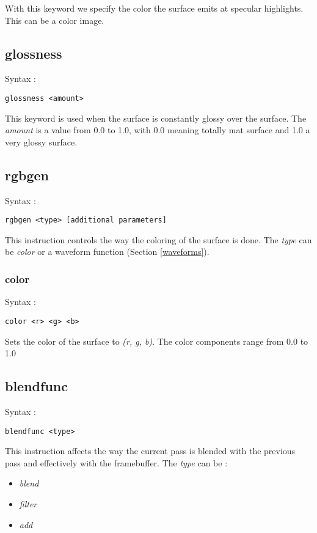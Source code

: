 \documentclass[12pt, titlepage]{amsart}
\begin{document}
With this keyword we specify the color the surface emits at specular
highlights. This can be a color image.

\subsection{glossness}
Syntax :
\begin{verbatim}
glossness <amount>
\end{verbatim}

This keyword is used when the surface is constantly glossy over the
surface. The \textit{amount} is a value from 0.0 to 1.0, with 0.0
meaning totally mat surface and 1.0 a very glossy surface.

\subsection{rgbgen}
Syntax :
\begin{verbatim}
rgbgen <type> [additional parameters]
\end{verbatim}

This instruction controls the way the coloring of the surface is done.
The \textit{type} can be \textit{color} or a waveform function (Section \ref{waveforms}).

\subsubsection{color}
Syntax :
\begin{verbatim}
color <r> <g> <b>
\end{verbatim}

Sets the color of the surface to \textit{(r, g, b)}. The color components
range from 0.0 to 1.0

\subsection{blendfunc}
Syntax :
\begin{verbatim}
blendfunc <type>
\end{verbatim}

This instruction affects the way the current pass is blended with the
previous pass and effectively with the framebuffer. The \textit{type}
can be :

\begin{itemize}
\item \textit{blend}
\item \textit{filter}
\item \textit{add}
\end{itemize}
\end{document}
